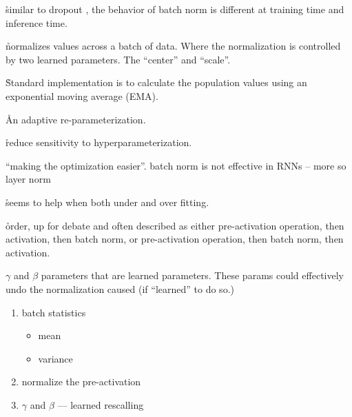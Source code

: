 \r{similar to dropout \ALR, the behavior of batch norm is different at training time and inference time.}

\r{normalizes values across a batch of data. Where the normalization is controlled by two learned parameters. The ``center'' and ``scale''.}

\r{Standard implementation is to calculate the population values using an exponential moving average (EMA).}



\r{An adaptive re-parameterization.}

\r{reduce sensitivity to hyperparameterization.}


\r{``making the optimization easier''. batch norm is not effective in RNNs -- more so layer norm}

\r{seems to help when both under and over fitting.}

\r{order, up for debate and often described as either pre-activation operation, then activation, then batch norm, or pre-activation operation, then batch norm, then activation.}

\r{$\gamma$ and $\beta$ parameters that are learned parameters. These params could effectively undo the normalization caused (if ``learned'' to do so.)}


\begin{enumerate}[noitemsep,topsep=0pt]
	\item batch statistics
	\begin{itemize}[noitemsep,topsep=0pt]
		\item mean
		\item variance
	\end{itemize}
	\item normalize the pre-activation
	\item $\gamma$ and $\beta$ --- learned rescalling
\end{enumerate}




